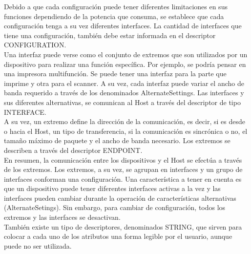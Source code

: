 Debido a que cada configuración puede tener diferentes limitaciones en sus funciones dependiendo de la potencia que consuma, se establece que cada configuración tenga a su vez diferentes interfaces. La cantidad de interfaces que tiene una configuración, también debe estar informada en el descriptor CONFIGURATION.\\

Una interfaz puede verse como el conjunto de extremos que son utilizados por un dispositivo para realizar una función específica. Por ejemplo, se podría pensar en una impresora multifunción. Se puede tener una interfaz para la parte que imprime y otra para el scanner. A su vez, cada interfaz puede variar el ancho de banda requerido a través de los denominados AlternateSettings. Las interfaces y sus diferentes alternativas, se comunican al Host a través del descriptor de tipo INTERFACE.\\

A su vez, un extremo define la dirección de la comunicación, es decir, si es desde o hacia el Host, un tipo de transferencia, si la comunicación es sincrónica o no, el tamaño máximo de paquete y el ancho de banda necesario. Los extremos se describen a través del descriptor ENDPOINT.\\

En resumen, la comunicación entre los dispositivos y el Host se efectúa a través de los extremos. Los extremos, a su vez, se agrupan en interfaces y un grupo de interfaces conforman una configuración. Una característica a tener en cuenta es que un dispositivo puede tener diferentes interfaces activas a la vez y las interfaces pueden cambiar durante la operación de características alternativas (AlternateSetings). Sin embargo, para cambiar de configuración, todos los extremos y las interfaces se desactivan.\\

También existe un tipo de descriptores, denominados STRING, que sirven para colocar a cada uno de los atributos una forma legible por el usuario, aunque puede no ser utilizada.\\ 

